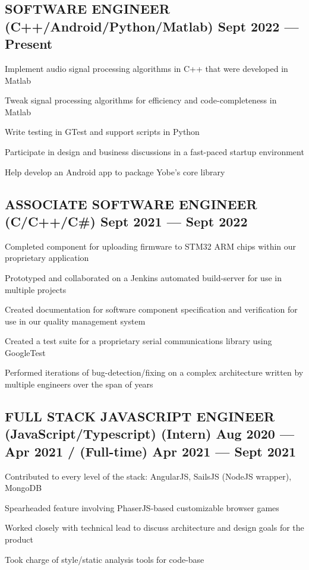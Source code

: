 \documentclass[letter,10pt]{article}
\begin{document}
\subsection{{SOFTWARE ENGINEER (C++/Android/Python/Matlab) \texorpdfstring{\hfill}{\space} Sept 2022 --- Present}}
\begin{zitemize}
    \item Implement audio signal processing algorithms in C++ that were developed in Matlab
    \item Tweak signal processing algorithms for efficiency and code-completeness in Matlab
    \item Write testing in GTest and support scripts in Python
    \item Participate in design and business discussions in a fast-paced startup environment
    \item Help develop an Android app to package Yobe's core library 
\end{zitemize}

\subsection{{ASSOCIATE SOFTWARE ENGINEER (C/C++/C\#) \texorpdfstring{\hfill}{\space} Sept 2021 --- Sept 2022}}
\begin{zitemize}
    \item Completed component for uploading firmware to STM32 ARM chips within our proprietary application
    \item Prototyped and collaborated on a Jenkins automated build-server for use in multiple projects
    \item Created documentation for software component specification and verification for use in our quality management system
    \item Created a test suite for a proprietary serial communications library using GoogleTest
    \item Performed iterations of bug-detection/fixing on a complex architecture written by multiple engineers over the span of years
\end{zitemize}

\subsection{{FULL STACK JAVASCRIPT ENGINEER (JavaScript/Typescript) \texorpdfstring{\hfill}{\space} (Intern) Aug 2020 --- Apr 2021 / (Full-time) Apr 2021 --- Sept 2021}}
\begin{zitemize}
    \item Contributed to every level of the stack: AngularJS, SailsJS (NodeJS wrapper), MongoDB
    \item Spearheaded feature involving PhaserJS-based customizable browser games
    \item Worked closely with technical lead to discuss architecture and design goals for the product
    \item Took charge of style/static analysis tools for code-base
\end{zitemize}
\end{document}
